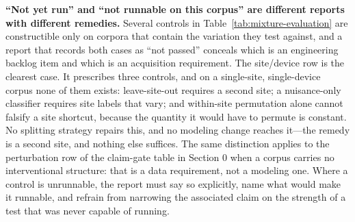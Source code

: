 \textbf{``Not yet run'' and ``not runnable on this corpus'' are different
reports with different remedies.} Several controls in
Table~\ref{tab:mixture-evaluation} are constructible only on corpora that
contain the variation they test against, and a report that records both cases
as ``not passed'' conceals which is an engineering backlog item and which is an
acquisition requirement. The site/device row is the clearest case. It prescribes
three controls, and on a single-site, single-device corpus none of them exists:
leave-site-out requires a second site; a nuisance-only classifier requires site
labels that vary; and within-site permutation alone cannot falsify a site
shortcut, because the quantity it would have to permute is constant. No
splitting strategy repairs this, and no modeling change reaches it---the remedy
is a second site, and nothing else suffices. The same distinction applies to the
perturbation row of the claim-gate table in Section 0 when a corpus carries no
interventional structure: that is a data requirement, not a modeling one. Where
a control is unrunnable, the report must say so explicitly, name what would make
it runnable, and refrain from narrowing the associated claim on the strength of
a test that was never capable of running.

\twocolumn
